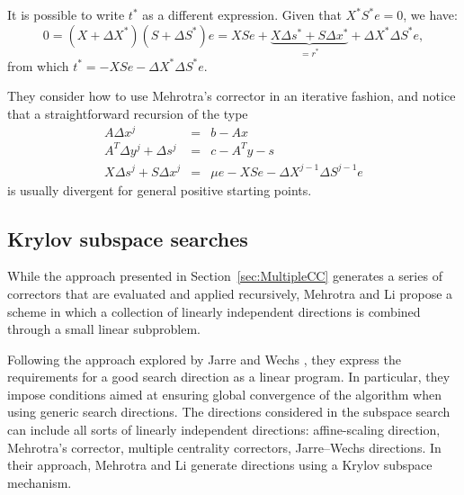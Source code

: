 It is possible to write $t^*$ as a different expression. 
Given that $X^*S^*e=0$, we have:
\[
0 = (X+\Delta X^*)(S+\Delta S^*)e = XSe + 
    \underbrace{X\Delta s^* +S\Delta x^*}_{=r^*} +\Delta X^*\Delta S^*e,
\]
from which $t^* = -XSe - \Delta X^* \Delta S^*e$.

They consider how to use Mehrotra's corrector in an iterative 
fashion, and notice that a straightforward recursion of the type
\begin{eqnarray*}
  A\Delta x^j &=& b-Ax \\
  A^T\Delta y^j +\Delta s^j &=& c-A^Ty-s \\
  X\Delta s^j + S\Delta x^j &=& \mu e  -XSe -\Delta X^{j-1}\Delta S^{j-1}e
\end{eqnarray*}
is usually divergent for general positive starting points.


%
%
\subsection{Krylov subspace searches}

While the approach presented in Section~\ref{sec:MultipleCC} 
generates a series of correctors 
that are evaluated and applied recursively, Mehrotra and Li 
\cite{MehrotraLi} propose a scheme in which a collection of linearly 
independent directions is combined through a small linear subproblem.

Following the approach explored by Jarre and Wechs \cite{JarreWechs}, 
they express the requirements for a good search direction as a linear 
program. In particular, they impose conditions aimed at ensuring 
global convergence of the algorithm when using generic search directions.
The directions considered in the subspace search can include all 
sorts of linearly independent directions: affine-scaling direction, 
Mehrotra's corrector, multiple centrality correctors, Jarre--Wechs 
directions. 
In their approach, Mehrotra and Li \cite{MehrotraLi}
generate directions using a Krylov subspace mechanism.


